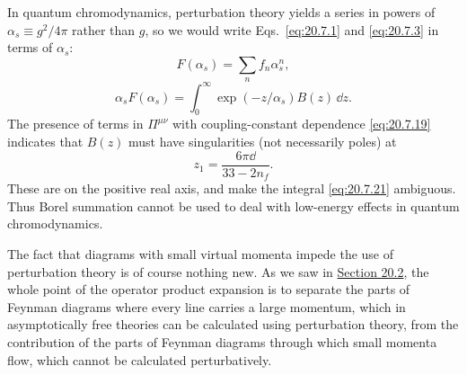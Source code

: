 In quantum chromodynamics, perturbation theory yields a series in powers of $\alpha_s\equiv g^2/4\pi$ rather than $g$, so we would write Eqs.~\eqref{eq:20.7.1} and \eqref{eq:20.7.3} in terms of $\alpha_s$:
\begin{equation}
F(\alpha_s)=\sum_n f_n\alpha_s^n,
\tag{20.7.20}\label{eq:20.7.20}
\end{equation}
\begin{equation}
\alpha_sF(\alpha_s)
=\int_0^\infty\exp(-z/\alpha_s)B(z)\,\dd z.
\tag{20.7.21}\label{eq:20.7.21}
\end{equation}
The presence of terms in $\Pi^{\mu\nu}$ with coupling-constant dependence \eqref{eq:20.7.19} indicates that $B(z)$ must have singularities (not necessarily poles) at
\begin{equation}
z_1=\frac{6\pi \dd}{33-2n_f}.
\tag{20.7.22}\label{eq:20.7.22}
\end{equation}
These are on the positive real axis, and make the integral \eqref{eq:20.7.21} ambiguous. Thus Borel summation cannot be used to deal with low-energy effects in quantum chromodynamics.

The fact that diagrams with small virtual momenta impede the use of perturbation theory is of course nothing new. As we saw in \hyperref[sec:20.2]{Section 20.2}, the whole point of the operator product expansion is to separate the parts of Feynman diagrams where every line carries a large momentum, which in asymptotically free theories can be calculated using perturbation theory, from the contribution of the parts of Feynman diagrams through which small momenta flow, which cannot be calculated perturbatively.
